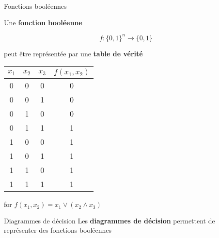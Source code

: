 \begin{frame}{Fonctions booléennes}

    Une \textbf{fonction booléenne}

    $$f : \{0, 1\}^n \to \{0, 1\}$$

    peut être représentée par une \textbf{table de vérité}

    \begin{center}
        \begin{tabular}{c|c|c|c}
            $x_1$ & $x_2$ & $x_3$ & $f(x_1, x_2)$ \\
            \hline
            0 & 0 & 0 & 0 \\
            0 & 0 & 1 & 0 \\
            0 & 1 & 0 & 0 \\
            0 & 1 & 1 & 1 \\
            1 & 0 & 0 & 1 \\
            1 & 0 & 1 & 1 \\
            1 & 1 & 0 & 1 \\
            1 & 1 & 1 & 1
        \end{tabular}

        \vspace{1em}
        \small{for $f(x_1, x_2) = x_1 \lor (x_2 \land x_3)$}
    \end{center}
\end{frame}

\begin{frame}{Diagrammes de décision}
    Les \textbf{diagrammes de décision} permettent de représenter des fonctions booléennes

\vspace{1em}
\end{frame}

